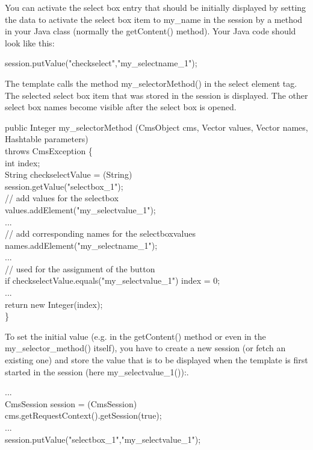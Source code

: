 You can activate the select box entry that should be initially displayed
by setting the data to activate the select box item to {\name my\_name} in
the session by a method in your Java class (normally the {\meth getContent()}
method). Your Java code should look like this:

{\code session.putValue("checkselect","my\_selectname\_1");}

The template calls the method {\meth my\_selectorMethod()} in the select element
tag. The selected select box item that was stored in the session is
displayed. The other select box names become visible after the select box
is opened.

\begin{java}
public Integer my\_selectorMethod (CmsObject cms, Vector values, Vector names, Hashtable parameters)\\
\jtabb                throws CmsException \{\\
\jtabb                int index;\\
\jtaba          String checkselectValue = (String)\\
\jtaba        session.getValue("selectbox\_1");\\
\jtaba        // add values for the selectbox\\
\jtaba        values.addElement("my\_selectvalue\_1");\\
\jtaba        ...\\
\jtaba        // add corresponding names for the selectboxvalues\\
\jtaba        names.addElement("my\_selectname\_1");\\
\jtaba        ...\\
\jtaba        // used for the assignment of the button\\
\jtaba        if checkselectValue.equals("my\_selectvalue\_1") index = 0;\\
\jtaba        ...\\
\jtaba        return new Integer(index);\\
\}\\
\end{java}

To set the initial value (e.g. in the {\meth getContent()} method or even in the
{\meth my\_selector\_method()} itself), you have to create a new session (or fetch an
existing one) and store the value that is to be displayed when the
template is first started in the session (here {\meth my\_selectvalue\_1())}:.

\begin{java}
...\\
CmsSession session = (CmsSession)\\
cms.getRequestContext().getSession(true);\\
...\\
session.putValue("selectbox\_1","my\_selectvalue\_1");\\
\end{java}


